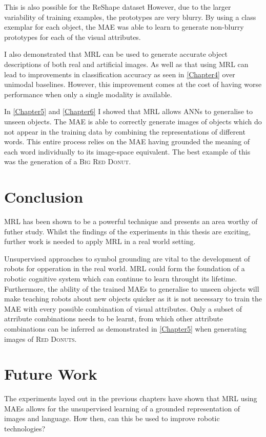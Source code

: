 This is also possible for the ReShape dataset However, due to the larger variability of training examples, the prototypes are very blurry. By using a class exemplar for each object, the \ac{MAE} was able to learn to generate non-blurry prototypes for each of the visual attributes.

I also demonstrated that \ac{MRL} can be used to generate accurate object descriptions of both real and artificial images. As well as that using \ac{MRL} can lead to improvements in classification accuracy as seen in \autoref{Chapter4} over unimodal baselines. However, this improvement comes at the cost of having worse performance when only a single modality is available.

In \autoref{Chapter5} and \autoref{Chapter6} I showed that \ac{MRL} allows \acp{ANN} to generalise to unseen objects. The \ac{MAE} is able to correctly generate images of objects which do not appear in the training data by combining the representations of different words. This entire process relies on the \ac{MAE} having grounded the meaning of each word individually to its image-space equivalent. The best example of this was the generation of a \textsc{Big Red Donut}.


\section{Conclusion}
\ac{MRL} has been shown to be a powerful technique and presents an area worthy of futher study. Whilst the findings of the experiments in this thesis are exciting, further work is needed to apply \ac{MRL} in a real world setting.

Unsupervised approaches to symbol grounding are vital to the development of robots for opperation in the real world. \ac{MRL} could form the foundation of a robotic cognitive system which can continue to learn throught its lifetime. Furthermore, the ability of the trained \acp{MAE} to generalise to unseen objects will make teaching robots about new objects quicker as it is not necessary to train the \ac{MAE} with every possible combination of visual attributes. Only a subset of atrribute combinations needs to be learnt, from which other attribute combinations can be inferred as demonstrated in \autoref{Chapter5} when generating images of \textsc{Red Donuts}.



\section{Future Work}
The experiments layed out in the previous chapters have shown that \ac{MRL} using \acp{MAE} allows for the unsupervised learning of a grounded representation of images and language. How then, can this be used to improve robotic technologies?

